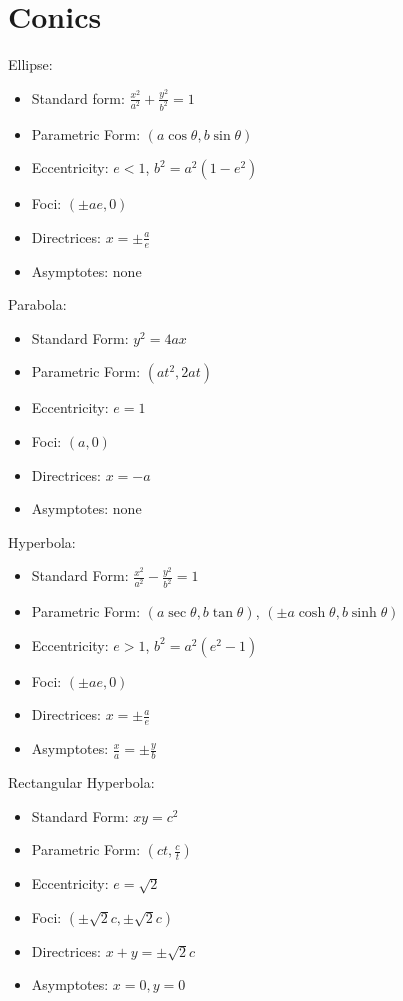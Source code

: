 \documentclass[10pt,a4paper,oneside]{book}
\begin{document}
\section*{Conics}
Ellipse:
\begin{itemize}
    \item Standard form: $\frac{x^2}{a^2}+\frac{y^2}{b^2}=1$
    \item Parametric Form: $(a\cos\theta, b\sin\theta)$
    \item Eccentricity: $e<1$, $b^2=a^2(1-e^2)$
    \item Foci: $(\pm ae,0)$
    \item Directrices: $x=\pm \frac{a}{e}$
    \item Asymptotes: none 
\end{itemize}

Parabola: 
\begin{itemize}
    \item Standard Form: $y^2=4ax$
    \item Parametric Form: $(at^2,2at)$
    \item Eccentricity: $e=1$
    \item Foci: $(a,0)$
    \item Directrices: $x=-a$
    \item Asymptotes: none 
\end{itemize}

Hyperbola:
\begin{itemize}
    \item Standard Form: $\frac{x^2}{a^2}-\frac{y^2}{b^2}=1$
    \item Parametric Form: $(a\sec\theta, b\tan\theta)$, $(\pm a\cosh \theta, b\sinh \theta)$
    \item Eccentricity: $e>1$, $b^2=a^2(e^2-1)$
    \item Foci: $(\pm ae,0)$
    \item Directrices: $x=\pm \frac{a}{e}$
    \item Asymptotes: $\frac{x}{a}=\pm \frac{y}{b}$
\end{itemize}

Rectangular Hyperbola:
\begin{itemize}
    \item Standard Form: $xy=c^2$
    \item Parametric Form: $\left(ct,\frac{c}{t}\right)$
    \item Eccentricity: $e=\sqrt{2}$
    \item Foci: $(\pm \sqrt{2}c, \pm\sqrt{2}c)$
    \item Directrices: $x+y=\pm \sqrt{2}c$
    \item Asymptotes: $x=0, y=0$
\end{itemize}
\end{document}
